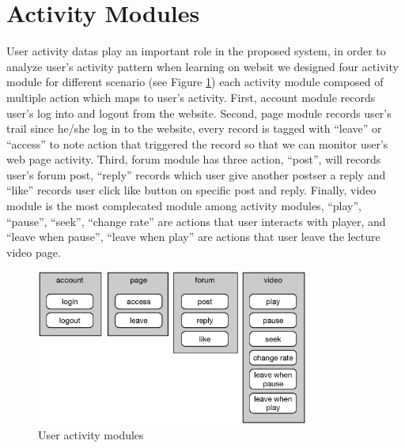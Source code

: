 \section{Activity Modules}
User activity datas play an important role in the proposed system, in order to analyze user's activity pattern when learning on websit we designed four activity module for different scenario (see Figure \ref{fig:act-module}) each activity module composed of multiple action which maps to user's activity.
First, account module records user's log into and logout from the website.
Second, page module records user's trail since he/she log in to the website, every record is tagged with ``leave'' or ``access'' to note action that triggered the record so that we can monitor user's web page activity.
Third, forum module has three action, ``post'', will records user's forum post, ``reply'' records which user give another postser a reply and ``like'' records user click like button on specific post and reply.
Finally, video module is the most complecated module among activity modules, ``play'', ``pause'', ``seek'', ``change rate'' are actions that user interacts with player, and ``leave when pause'', ``leave when play'' are actions that user leave the lecture video page.
\begin{figure}[H]
    \centering
    \includegraphics[width = 0.8\textwidth]{fig/activity-module.eps}
    \caption{User activity modules}
    \label{fig:act-module}
\end{figure}

